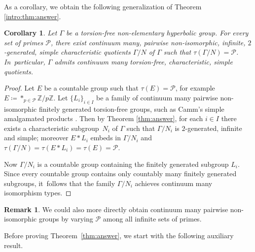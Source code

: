 \documentclass[JEP,XML,SOM,Unicode]{cedram}
\newtheorem{corollary}[theorem]{Corollary}
\theoremstyle{definition}
\newtheorem{remark}[theorem]{Remark}
\begin{document}
As a corollary, we obtain the following generalization of Theorem \ref{intro:thm:answer}.

\begin{corollary}
\label{cor:answer}
Let $\Gamma$ be a torsion-free non-elementary hyperbolic group. For every set of primes $\mathcal{P}$, there exist continuum many, pairwise non-isomorphic, infinite, $2$\nobreakdash-generated, simple characteristic quotients $\Gamma/N$ of $\Gamma$ such that $\tau(\Gamma/N) = \mathcal{P}$. In~particular, $\Gamma$ admits continuum many torsion-free, characteristic, simple quotients.
\end{corollary}

\begin{proof}
Let $E$ be a countable group such that $\tau(E) \!=\! \mathcal{P}$, for example \hbox{$E \!\coloneqq\! \ast_{p \in \mathcal{P}} \mathbb{Z}/p\mathbb{Z}$}.
Let $\{ L_i \}_{i \in I}$ be a family of continuum many pairwise non-isomorphic finitely generated torsion-free groups, such as Camm's simple amalgamated products \cite{camm}.
Then by Theorem \ref{thm:answer}, for each $i \in I$ there exists a characteristic subgroup~$N_i$ of $\Gamma$ such that $\Gamma / N_i$ is $2$-generated, infinite and simple; moreover $E \ast L_i$ embeds in $\Gamma / N_i$ and $\tau(\Gamma / N) = \tau(E \ast L_i) = \tau(E) = \mathcal{P}$.

Now $\Gamma / N_i$ is a countable group containing the finitely generated subgroup $L_i$.
Since every countable group contains only countably many finitely generated subgroups, it~follows that the family $\Gamma / N_i$ achieves continuum many isomorphism types.
\end{proof}

\begin{remark}
We could also more directly obtain continuum many pairwise non-isomorphic groups by varying $\mathcal{P}$ among all infinite sets of primes.
\end{remark}

Before proving Theorem~\ref{thm:answer}, we start with the following auxiliary result.
\end{document}
